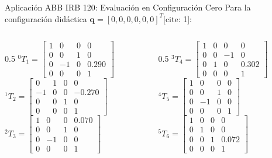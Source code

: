 \documentclass[aspectratio=169, table, xcdraw]{beamer}
\begin{document}
\begin{frame}{Aplicación ABB IRB 120: Evaluación en Configuración Cero}
    Para la configuración didáctica $\mathbf{q} = [0, 0, 0, 0, 0, 0]^T$[cite: 1]:

    \begin{columns}
        \begin{column}{0.5\textwidth}
            \footnotesize
            $ {}^{0}T_1 = \begin{bmatrix} 1&0&0&0 \\ 0&0&1&0 \\ 0&-1&0&0.290 \\ 0&0&0&1 \end{bmatrix}$ \\ \vspace{0.1cm}
            $ {}^{1}T_2 = \begin{bmatrix} 0&1&0&0 \\ -1&0&0&-0.270 \\ 0&0&1&0 \\ 0&0&0&1 \end{bmatrix}$ \\ \vspace{0.1cm}
            $ {}^{2}T_3 = \begin{bmatrix} 1&0&0&0.070 \\ 0&0&1&0 \\ 0&-1&0&0 \\ 0&0&0&1 \end{bmatrix}$
        \end{column}
        
        \begin{column}{0.5\textwidth}
            \footnotesize
            $ {}^{3}T_4 = \begin{bmatrix} 1&0&0&0 \\ 0&0&-1&0 \\ 0&1&0&0.302 \\ 0&0&0&1 \end{bmatrix}$ \\ \vspace{0.1cm}
            $ {}^{4}T_5 = \begin{bmatrix} 1&0&0&0 \\ 0&0&1&0 \\ 0&-1&0&0 \\ 0&0&0&1 \end{bmatrix}$ \\ \vspace{0.1cm}
            $ {}^{5}T_6 = \begin{bmatrix} 1&0&0&0 \\ 0&1&0&0 \\ 0&0&1&0.072 \\ 0&0&0&1 \end{bmatrix}$
        \end{column}
    \end{columns}
\end{frame}
\end{document}
